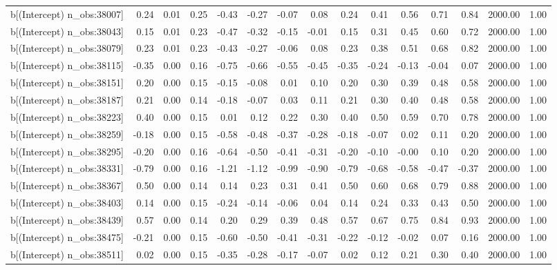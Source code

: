 \begin{table}[ht]
\begin{tabular}{rrrrrrrrrrrrrrr}
  b[(Intercept) n\_obs:38007] & 0.24 & 0.01 & 0.25 & -0.43 & -0.27 & -0.07 & 0.08 & 0.24 & 0.41 & 0.56 & 0.71 & 0.84 & 2000.00 & 1.00 \\ 
  b[(Intercept) n\_obs:38043] & 0.15 & 0.01 & 0.23 & -0.47 & -0.32 & -0.15 & -0.01 & 0.15 & 0.31 & 0.45 & 0.60 & 0.72 & 2000.00 & 1.00 \\ 
  b[(Intercept) n\_obs:38079] & 0.23 & 0.01 & 0.23 & -0.43 & -0.27 & -0.06 & 0.08 & 0.23 & 0.38 & 0.51 & 0.68 & 0.82 & 2000.00 & 1.00 \\ 
  b[(Intercept) n\_obs:38115] & -0.35 & 0.00 & 0.16 & -0.75 & -0.66 & -0.55 & -0.45 & -0.35 & -0.24 & -0.13 & -0.04 & 0.07 & 2000.00 & 1.00 \\ 
  b[(Intercept) n\_obs:38151] & 0.20 & 0.00 & 0.15 & -0.15 & -0.08 & 0.01 & 0.10 & 0.20 & 0.30 & 0.39 & 0.48 & 0.58 & 2000.00 & 1.00 \\ 
  b[(Intercept) n\_obs:38187] & 0.21 & 0.00 & 0.14 & -0.18 & -0.07 & 0.03 & 0.11 & 0.21 & 0.30 & 0.40 & 0.48 & 0.58 & 2000.00 & 1.00 \\ 
  b[(Intercept) n\_obs:38223] & 0.40 & 0.00 & 0.15 & 0.01 & 0.12 & 0.22 & 0.30 & 0.40 & 0.50 & 0.59 & 0.70 & 0.78 & 2000.00 & 1.00 \\ 
  b[(Intercept) n\_obs:38259] & -0.18 & 0.00 & 0.15 & -0.58 & -0.48 & -0.37 & -0.28 & -0.18 & -0.07 & 0.02 & 0.11 & 0.20 & 2000.00 & 1.00 \\ 
  b[(Intercept) n\_obs:38295] & -0.20 & 0.00 & 0.16 & -0.64 & -0.50 & -0.41 & -0.31 & -0.20 & -0.10 & -0.00 & 0.10 & 0.20 & 2000.00 & 1.00 \\ 
  b[(Intercept) n\_obs:38331] & -0.79 & 0.00 & 0.16 & -1.21 & -1.12 & -0.99 & -0.90 & -0.79 & -0.68 & -0.58 & -0.47 & -0.37 & 2000.00 & 1.00 \\ 
  b[(Intercept) n\_obs:38367] & 0.50 & 0.00 & 0.14 & 0.14 & 0.23 & 0.31 & 0.41 & 0.50 & 0.60 & 0.68 & 0.79 & 0.88 & 2000.00 & 1.00 \\ 
  b[(Intercept) n\_obs:38403] & 0.14 & 0.00 & 0.15 & -0.24 & -0.14 & -0.06 & 0.04 & 0.14 & 0.24 & 0.33 & 0.43 & 0.50 & 2000.00 & 1.00 \\ 
  b[(Intercept) n\_obs:38439] & 0.57 & 0.00 & 0.14 & 0.20 & 0.29 & 0.39 & 0.48 & 0.57 & 0.67 & 0.75 & 0.84 & 0.93 & 2000.00 & 1.00 \\ 
  b[(Intercept) n\_obs:38475] & -0.21 & 0.00 & 0.15 & -0.60 & -0.50 & -0.41 & -0.31 & -0.22 & -0.12 & -0.02 & 0.07 & 0.16 & 2000.00 & 1.00 \\ 
  b[(Intercept) n\_obs:38511] & 0.02 & 0.00 & 0.15 & -0.35 & -0.28 & -0.17 & -0.07 & 0.02 & 0.12 & 0.21 & 0.30 & 0.40 & 2000.00 & 1.00 \\ 

\end{tabular}
\end{table}
